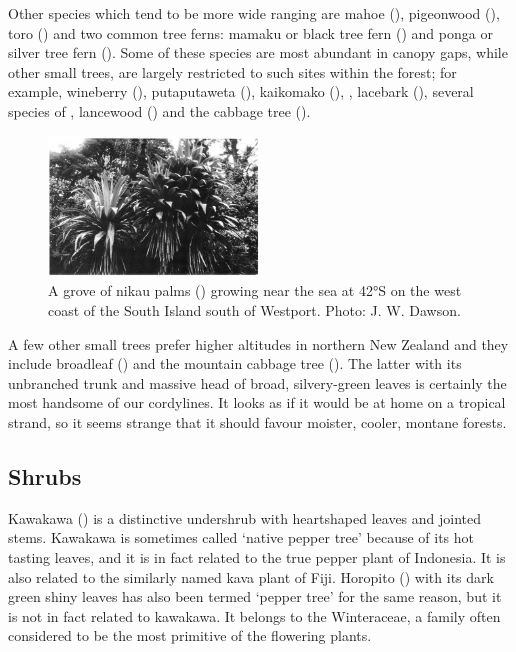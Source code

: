Other species which tend to be more wide ranging are mahoe (), pigeonwood (), toro () and two common tree ferns: mamaku or black tree fern () and ponga or silver tree fern ().
Some of these species are most abundant in canopy gaps, while other small trees, are largely restricted to such sites within the forest; for example, wineberry (), putaputaweta (), kaikomako (),  , lacebark (), several species of , lancewood () and the cabbage tree ().

\begin{figure}
	\includegraphics[width=0.5\textwidth]{graphics/figure61cabbagetree.jpg}
	\centering
	\caption[A grove of nikau palms]{A grove of nikau palms () growing near the sea at 42°S on the west coast of the South Island south of Westport. Photo:  J. W. Dawson.}%
	\label{fig:61cabbagetree}
\end{figure}

A few other small trees prefer higher altitudes in northern New Zealand and they include broadleaf () and the mountain cabbage tree ().
The latter with its unbranched trunk and massive head of broad, silvery-green leaves is certainly the most handsome of our cordylines.
It looks as if it would be at home on a tropical strand, so it seems strange that it should favour moister, cooler, montane forests.

\subsection{Shrubs}

Kawakawa () is a distinctive undershrub with heartshaped leaves and jointed stems.
Kawakawa is sometimes called `native pepper tree' because of its hot tasting leaves, and it is in fact related to the true pepper plant of Indonesia.
It is also related to the similarly named kava plant of Fiji.
Horopito () with its dark green shiny leaves has also been termed `pepper tree' for the same reason, but it is not in fact related to kawakawa.
It belongs to the Winteraceae, a family often considered to be the most primitive of the flowering plants.

